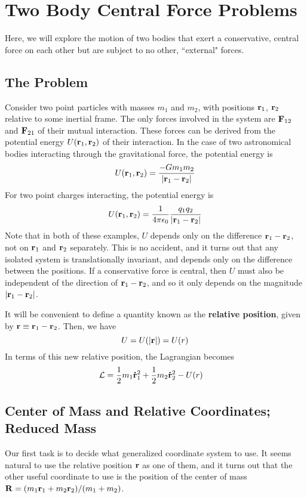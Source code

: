 \chapter{Two Body Central Force Problems}
Here, we will explore the motion of two bodies that exert a conservative, central force on each other but are subject to no other, ``external" forces.      
\section{The Problem}
Consider two point particles with masses $m_1$ and $m_2$, with positions $\mathbf{r}_1$, $\mathbf{r}_2$ relative to some inertial frame. The only forces involved in the system are $\mathbf{F}_{12}$ and $\mathbf{F}_{21}$ of their mutual interaction. These forces can be derived from the potential energy $U(\mathbf{r}_1, \mathbf{r}_2)$ of their interaction. In the case of two astronomical bodies interacting through the gravitational force, the potential energy is
\[ U(\mathbf{r}_1, \mathbf{r}_2) = \frac{-Gm_1m_2}{\abs{\mathbf{r}_1 - \mathbf{r}_2}}\]
For two point charges interacting, the potential energy is
\[ U(\mathbf{r}_1, \mathbf{r}_2) = \frac{1}{4\pi\epsilon_0} \frac{q_1q_2}{\abs{\mathbf{r}_1 - \mathbf{r}_2}} \]
Note that in both of these examples, $U$ depends only on the difference $\mathbf{r}_1 - \mathbf{r}_2$, not on $\mathbf{r}_1$ and $\mathbf{r}_2$ separately. This is no accident, and it turns out that any isolated system is translationally invariant, and depends only on the difference between the positions. If a conservative force is central, then $U$ must also be independent of the direction of $\mathbf{r}_1 - \mathbf{r}_2$, and so it only depends on the magnitude $\abs{\mathbf{r}_1 - \mathbf{r}_2}$. 

It will be convenient to define a quantity known as the \textbf{relative position}, given by $\mathbf{r} \equiv \mathbf{r}_1 - \mathbf{r}_2$. Then, we have
\[ U = U(\abs{\mathbf{r}}) = U(r)\]
In terms of this new relative position, the Lagrangian becomes
\begin{align*}
    \mathcal{L} &= \frac{1}{2}m_1 \mathbf{\dot r}_1^2 + \frac{1}{2}m_2 \mathbf{\dot r}_2^2 - U(r)
\end{align*}
\section{Center of Mass and Relative Coordinates; Reduced Mass}
Our first task is to decide what generalized coordinate system to use. It seems natural to use the relative position $\mathbf{r}$ as one of them, and it turns out that the other useful coordinate to use is the position of the center of mass $\mathbf{R} = (m_1\mathbf{r}_1 + m_2\mathbf{r}_2)/(m_1+m_2)$.

